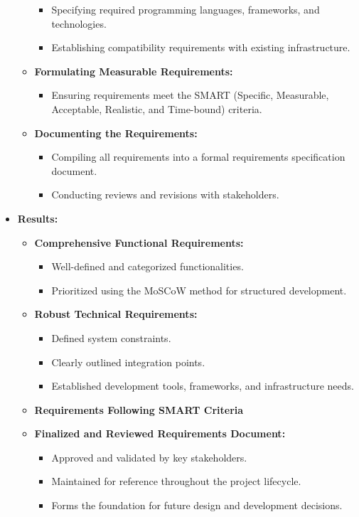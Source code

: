 \documentclass{article}
\begin{document}
\begin{itemize}[leftmargin=*, label={}]
\begin{itemize}
        \begin{itemize}
            \item Specifying required programming languages, frameworks, and technologies.
            \item Establishing compatibility requirements with existing infrastructure.
        \end{itemize}
        \item \textbf{Formulating Measurable Requirements:}
        \begin{itemize}
            \item Ensuring requirements meet the SMART (Specific, Measurable, Acceptable, Realistic, and Time-bound) criteria.
        \end{itemize}
        \item \textbf{Documenting the Requirements:}
        \begin{itemize}
            \item Compiling all requirements into a formal requirements specification document.
            \item Conducting reviews and revisions with stakeholders.
        \end{itemize}
    \end{itemize}

    \item \textbf{Results:}
    \begin{itemize}
        \item \textbf{Comprehensive Functional Requirements:}
        \begin{itemize}
            \item Well-defined and categorized functionalities.
            \item Prioritized using the MoSCoW method for structured development.
        \end{itemize}
        \item \textbf{Robust Technical Requirements:}
        \begin{itemize}
            \item Defined system constraints.
            \item Clearly outlined integration points.
            \item Established development tools, frameworks, and infrastructure needs.
        \end{itemize}
        \item \textbf{Requirements Following SMART Criteria}
        \item \textbf{Finalized and Reviewed Requirements Document:}
        \begin{itemize}
            \item Approved and validated by key stakeholders.
            \item Maintained for reference throughout the project lifecycle.
            \item Forms the foundation for future design and development decisions.
        \end{itemize}
    \end{itemize}
\end{itemize}
\end{document}

